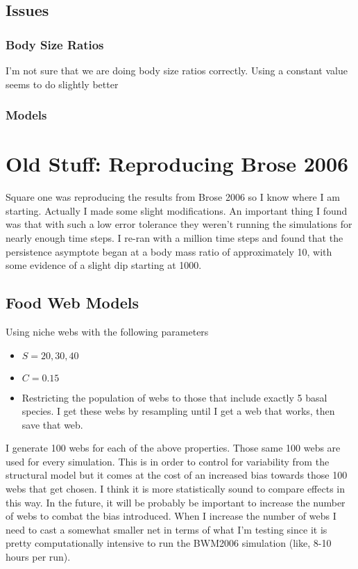 \documentclass[11pt]{amsart}
\begin{document}
\newpage

\subsection{Issues} 
\subsubsection{Body Size Ratios}
I'm not sure that we are doing body size ratios correctly.  Using a constant value seems to do slightly better
\subsubsection{Models}

\newpage

\section{Old Stuff: Reproducing Brose 2006}
Square one was reproducing the results from Brose 2006 so I know where I am starting.  Actually I made some slight modifications.  An important thing I found was that with such a low error tolerance they weren't running the simulations for nearly enough time steps.  I re-ran with a million time steps and found that the persistence asymptote began at a body mass ratio of approximately 10, with some evidence of a slight dip starting at 1000.
\subsection{Food Web Models}
Using niche webs with the following parameters
\begin{itemize}
\item $S = 20,30,40$
\item $C = 0.15$
\item Restricting the population of webs to those that include exactly 5 basal species.  I get these webs by resampling until I get a web that works, then save that web.
\end{itemize}

I generate 100 webs for each of the above properties.  Those same 100 webs are used for every simulation.  This is in order to control for variability from the structural model but it comes at the cost of an increased bias towards those 100 webs that get chosen.  I think it is more statistically sound to compare effects in this way.  In the future, it will be probably be important to increase the number of webs to combat the bias introduced.  When I increase the number of webs I need to cast a somewhat smaller net in terms of what I'm testing since it is pretty computationally intensive to run the BWM2006 simulation (like, 8-10 hours per run).
\end{document}

